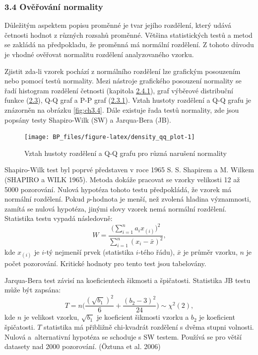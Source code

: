 \documentclass[12pt,]{article}
\begin{document}
\hypertarget{normtests}{\subsubsection{3.4 Ověřování
normality}\label{normtests}}

\qquad Důležitým aspektem popisu proměnné je tvar jejího rozdělení,
který udává četnosti hodnot z různých rozsahů proměnné. Většina
statistických testů a metod se zakládá na předpokladu, že proměnná má
normální rozdělení. Z tohoto důvodu je vhodné ověřovat normalitu
rozdělení analyzovaného vzorku.

\qquad Zjistit zda-li vzorek pochází z normálního rozdělení lze
grafickým posouzením nebo pomocí testů normality. Mezi nástroje
grafického posouzení normality se řadí histogram rozdělení četnosti
(kapitola \protect\hyperlink{hist}{2.4.1}), graf výběrové distribuční
funkce (\protect\hyperlink{distribution}{2.3}), Q-Q graf a P-P graf
(\protect\hyperlink{qqpp}{2.3.1}). Vztah hustoty rozdělení a Q-Q grafu
je znázorněn na obrázku \ref{fig:ch3.4}. Dále existuje řada testů
normality, zde jsou popsány testy Shapiro-Wilk (SW) a Jarqua-Bera (JB).

\begin{figure}[H]

{\centering \texttt{[image: BP\_files/figure-latex/density\_qq\_plot-1]} 

}

\caption{\label{fig:ch3.4} Vztah hustoty rozdělení a Q-Q grafu pro různá narušení normality}\label{fig:density_qq_plot}
\end{figure}

\qquad Shapiro-Wilk test byl poprvé představen v roce 1965 S. S.
Shapirem a M. Wilkem (SHAPIRO a WILK 1965). Metoda dokáže pracovat se
vzorky velikosti 12 až 5000 pozorování. Nulová hypotéza tohoto testu
předpokládá, že vzorek má normální rozdělení. Pokud \(p\)-hodnota je
menší, než zvolená hladina významnosti, zamítá se nulová hypotéza,
jinými slovy vzorek nemá normální rozdělení. Statistika testu vypadá
následovně:
\[W = \frac{\big(\sum \limits^n_{i=1} a_i x_{(i)}\big)^2}{\sum \limits^n_{i=1}(x_i - \bar{x})^2},\]
kde \(x_{(i)}\) je \(i\)-tý nejmenší prvek (statistika \(i\)-tého řádu),
\(\bar{x}\) je průměr vzorku, \(n\) je počet pozorování. Kritické
hodnoty pro tento test jsou tabelovány.

\qquad Jarqua-Bera test závisí na koeficientech šikmosti a špičatosti.
Statistika JB testu může být zapsána:
\[T = n \bigg( \frac{(\sqrt{b_1})^2}{6} + \frac{(b_2 - 3)^2}{24} \bigg) \sim \chi^2(2),\]
kde \(n\) je velikost vzorku, \(\sqrt{b_1}\) je koeficient šikmosti
vzorku a \(b_2\) je koeficient špičatosti. \(T\) statistika má přibližně
chi-kvadrát rozdělení s dvěma stupni volnosti. Nulová a~alternativní
hypotéza se schoduje s SW testem. Používá se pro větší datasety nad 2000
pozorování. (Öztuna et al. 2006)
\end{document}
